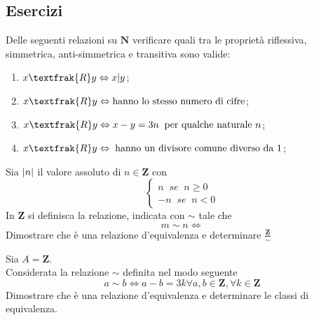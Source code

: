 \begin{flushleft}
\subsection{Esercizi}
\begin{esercizio}
Delle seguenti relazioni su $\mathbf{N}$ verificare quali tra le proprietà riflessiva, simmetrica, anti-simmetrica e transitiva sono valide:
\begin{enumerate}
    \item $x\textfrak{R}y\Leftrightarrow x|y$;\\
    \vspace{200px}
    \item $x\textfrak{R}y\Leftrightarrow \text{hanno lo stesso numero di cifre}$;\\
    \vspace{200px}
    \item $x\textfrak{R}y\Leftrightarrow x-y = 3n\;\;\text{per qualche naturale } n$;\\
    \vspace{200px}
    \item $x\textfrak{R}y\Leftrightarrow \;\text{hanno un divisore comune diverso da }1$;\\
    \vspace{200px}
\end{enumerate}
\end{esercizio}

\begin{esercizio}
Sia $\abs{n}$ il valore assoluto di $n \in \mathbf{Z}$ con
\[\begin{cases}
n\;\;se\;\;n\geq 0\\
-n\;\;se\;\;n<0
\end{cases}\]
In $\mathbf{Z}$ si definisca la relazione, indicata con $\sim$ tale che
\[m\sim n \Leftrightarrow\]
Dimostrare che è una relazione d'equivalenza e determinare $\frac{\mathbf{Z}}{\sim}$
\end{esercizio}
\vspace{200px}


\begin{esercizio}
Sia $A = \mathbf{Z}$.\\
Considerata la relazione $\sim$ definita nel modo seguente
\[a\sim b \Leftrightarrow a-b = 3k \forall a,b \in \mathbf{Z}, \forall k \in \mathbf{Z}\]
Dimostrare che è una relazione d'equivalenza e determinare le classi di equivalenza.
\end{esercizio}
\vspace{200px}


\end{flushleft}
